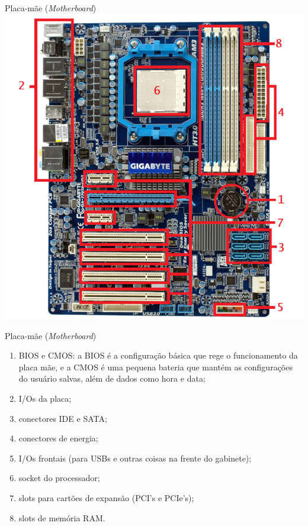 \begin{frame}{Placa-mãe (\textit{Motherboard})}
	\centering
	\includegraphics[width=0.6\linewidth]{Figuras/Ch02/fig6}
\end{frame}


\begin{frame}{Placa-mãe (\textit{Motherboard})}
	\begin{block}{}
		\begin{enumerate}
			\item BIOS e CMOS: a BIOS é a configuração básica que rege o funcionamento da placa mãe, e a CMOS é uma pequena bateria que mantém as configurações do usuário salvas, além de dados como hora e data;
			\item I/Os da placa;
			\item conectores IDE e SATA;
			\item conectores de energia;
			\item I/Os frontais (para USBs e outras coisas na frente do gabinete);
			\item socket do processador;
			\item slots para cartões de expansão (PCI's e PCIe's);
			\item slots de memória RAM.
		\end{enumerate}
	\end{block}
\end{frame}


